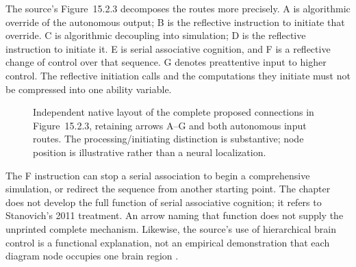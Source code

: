 The source's Figure~15.2.3 decomposes the routes more precisely. A is
algorithmic override of the autonomous output; B is the reflective
instruction to initiate that override. C is algorithmic decoupling into
simulation; D is the reflective instruction to initiate it. E is serial
associative cognition, and F is a reflective change of control over that
sequence. G denotes preattentive input to higher control. The reflective
initiation calls and the computations they initiate must not be compressed
into one ability variable.

\begin{figure}[htbp]
\centering
{}
\caption{Independent native layout of the complete proposed connections in
Figure~15.2.3, retaining arrows A--G and both autonomous input routes.
The processing/initiating distinction is substantive; node position is
illustrative rather than a neural localization.}
\label{fig:p19-rat152-functions}
\end{figure}

The F instruction can stop a serial association to begin a comprehensive
simulation, or redirect the sequence from another starting point. The
chapter does not develop the full function of serial associative cognition;
it refers to Stanovich's 2011 treatment. An arrow naming that function
does not supply the unprinted complete mechanism. Likewise, the source's
use of hierarchical brain control is a functional explanation, not an
empirical demonstration that each diagram node occupies one brain region
\cite[sec.~6, pp.~795--796]{StanovichToplakWest2021Intelligence}.

